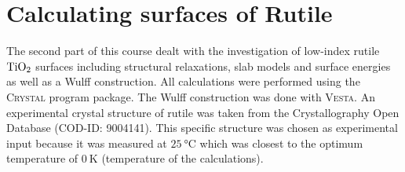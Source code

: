 \documentclass[a4paper,12pt,parskip=half]{scrartcl}
\begin{document}
\section{Calculating surfaces of Rutile}
%
The second part of this course dealt with the investigation of low-index rutile $ \ce{TiO2}$ surfaces including structural relaxations, slab models and surface energies as well as a Wulff construction. All calculations were performed using the \textsc{Crystal} program package. The Wulff construction was done with \textsc{Vesta}\autocite[]{vesta}. An experimental crystal structure of rutile\autocite[]{rutile-structure-cod} was taken from the Crystallography Open Database (COD-ID: 9004141). This specific structure was chosen as experimental input because it was measured at $ \SI{25}{\celsius} $ which was closest to the optimum temperature of $ \SI{0}{\kelvin} $ (temperature of the calculations).
%
\end{document}
